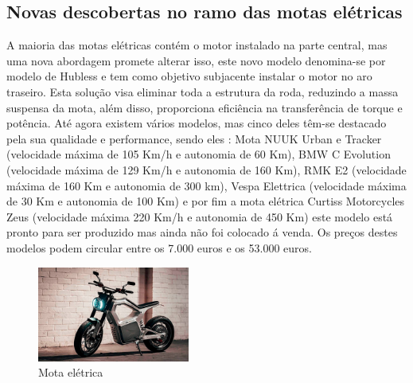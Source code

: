 \documentclass{report}
\begin{document}
\subsection{Novas descobertas no ramo das motas elétricas}
A maioria das motas elétricas contém o motor instalado na parte central, mas uma nova abordagem promete alterar isso, este novo modelo denomina-se por modelo de Hubless e tem como objetivo subjacente instalar o motor no aro traseiro. Esta solução visa eliminar toda a estrutura da roda, reduzindo a massa suspensa da mota, além disso, proporciona eficiência na transferência de torque e potência. 
Até agora existem vários modelos, mas cinco deles têm-se destacado pela sua qualidade e performance, sendo eles : Mota NUUK Urban e Tracker (velocidade máxima de 105 Km/h e autonomia de 60 Km), BMW C Evolution (velocidade máxima de 129 Km/h e autonomia de 160 Km), RMK E2 (velocidade máxima de 160 Km e autonomia de 300 km), Vespa Elettrica (velocidade máxima de 30 Km e autonomia de 100 Km) e por fim a mota elétrica Curtiss Motorcycles Zeus (velocidade máxima 220 Km/h e autonomia de 450 Km) este modelo está pronto para ser produzido mas ainda não foi colocado á venda. Os preços destes modelos podem circular entre os 7.000 euros e os 53.000 euros.

\begin{figure}[h]
\center
\includegraphics[width=5cm]{motaeletrica.jpeg} %
\caption{Mota elétrica}
\label{figura:motaeletrica}
\end{figure}
\end{document}
